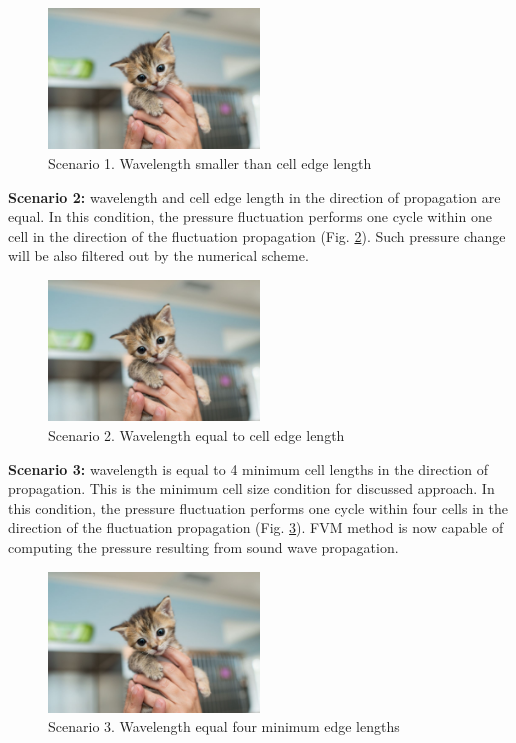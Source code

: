 \begin{figure}[h!]
\centering %
\includegraphics[width=0.5\textwidth]{Pictures/kitten-placeholder.jpg}
\caption{Scenario 1. Wavelength smaller than cell edge length}
\label{scen1}
\end{figure}

\textbf{Scenario 2:} wavelength and cell edge length in the direction of propagation are equal. In this condition, the pressure fluctuation performs one cycle within one cell in the direction of the fluctuation propagation (Fig. \ref{scen2}). Such pressure change will be also filtered out by the numerical scheme.

\begin{figure}[h!]
\centering %
\includegraphics[width=0.5\textwidth]{Pictures/kitten-placeholder.jpg}
\caption{Scenario 2. Wavelength equal to cell edge length}
\label{scen2}
\end{figure}

\textbf{Scenario 3:} wavelength is equal to 4 minimum cell lengths in the direction of propagation. This is the minimum cell size condition for discussed approach. In this condition, the pressure fluctuation performs one cycle within four cells in the direction of the fluctuation propagation (Fig. \ref{scen3}). FVM method is now capable of computing the pressure resulting from sound wave propagation.

\begin{figure}[h!]
\centering %
\includegraphics[width=0.5\textwidth]{Pictures/kitten-placeholder.jpg}
\caption{Scenario 3. Wavelength equal four minimum edge lengths}
\label{scen3}
\end{figure}

